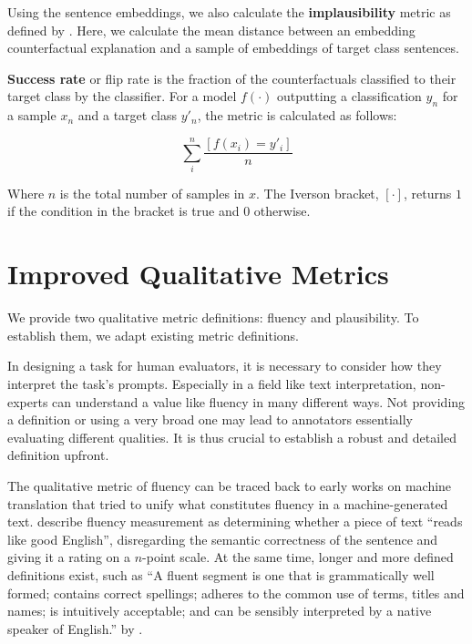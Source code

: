 \documentclass[11pt]{article}
\begin{document}
Using the sentence embeddings, we also calculate the \textbf{implausibility} metric as defined by \citet{altmeyer_faithful_2024}. Here, we calculate the mean distance between an embedding counterfactual explanation and a sample of embeddings of target class sentences.

\textbf{Success rate} or flip rate is the fraction of the counterfactuals classified to their target class by the classifier. For a model $f(\cdot)$ outputting a classification $y_n$ for a sample $x_n$ and a target class $y'_n$, the metric is calculated as follows:

\begin{equation*}
    \sum^n_i \frac{[ f(x_i) = y'_i ]}{n}
\end{equation*}

Where $n$ is the total number of samples in $x$. The Iverson bracket, $[ \cdot ]$, returns $1$ if the condition in the bracket is true and $0$ otherwise. 

\section{Improved Qualitative Metrics}\label{appendix:improved_metrics}

We provide two qualitative metric definitions: fluency and plausibility. To establish them, we adapt existing metric definitions. 

In designing a task for human evaluators, it is necessary to consider how they interpret the task's prompts. Especially in a field like text interpretation, non-experts can understand a value like fluency in many different ways. Not providing a definition or using a very broad one may lead to annotators essentially evaluating different qualities. It is thus crucial to establish a robust and detailed definition upfront.

The qualitative metric of fluency can be traced back to early works on machine translation that tried to unify what constitutes fluency in a machine-generated text. \citet{white_arpa_1994} describe fluency measurement as determining whether a piece of text ``reads like good English'', disregarding the semantic correctness of the sentence and giving it a rating on a $n$-point scale. At the same time, longer and more defined definitions exist, such as ``A fluent segment is one that is grammatically well formed; contains correct spellings; adheres to the common use of terms, titles and names; is intuitively acceptable; and can be sensibly interpreted by a native speaker of English.'' by \citet{ma_corpus_2006}.  
\end{document}
